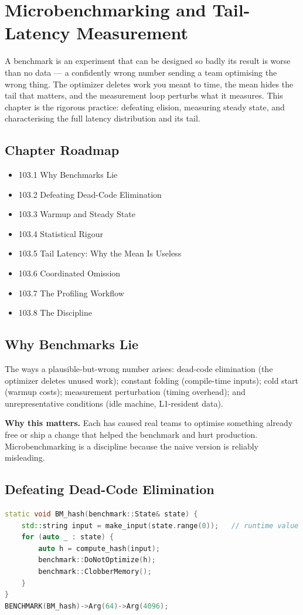 \chapter{Microbenchmarking and Tail-Latency Measurement}

A benchmark is an experiment that can be designed so badly its result is worse than no data --- a confidently wrong number sending a team optimising the wrong thing. The optimizer deletes work you meant to time, the mean hides the tail that matters, and the measurement loop perturbs what it measures. This chapter is the rigorous practice: defeating elision, measuring steady state, and characterising the full latency distribution and its tail.

\section*{Chapter Roadmap}
\begin{itemize}
\item 103.1 Why Benchmarks Lie
\item 103.2 Defeating Dead-Code Elimination
\item 103.3 Warmup and Steady State
\item 103.4 Statistical Rigour
\item 103.5 Tail Latency: Why the Mean Is Useless
\item 103.6 Coordinated Omission
\item 103.7 The Profiling Workflow
\item 103.8 The Discipline
\end{itemize}

\section{Why Benchmarks Lie}
The ways a plausible-but-wrong number arises: dead-code elimination (the optimizer deletes unused work); constant folding (compile-time inputs); cold start (warmup costs); measurement perturbation (timing overhead); and unrepresentative conditions (idle machine, L1-resident data).

\textbf{Why this matters.} Each has caused real teams to optimise something already free or ship a change that helped the benchmark and hurt production. Microbenchmarking is a discipline because the naive version is reliably misleading.

\section{Defeating Dead-Code Elimination}
\begin{lstlisting}[language=C++, caption={DoNotOptimize forces observation; ClobberMemory defeats store elision. Google Benchmark. Min standard: C++11.}]
static void BM_hash(benchmark::State& state) {
    std::string input = make_input(state.range(0));   // runtime value
    for (auto _ : state) {
        auto h = compute_hash(input);
        benchmark::DoNotOptimize(h);
        benchmark::ClobberMemory();
    }
}
BENCHMARK(BM_hash)->Arg(64)->Arg(4096);
\end{lstlisting}

